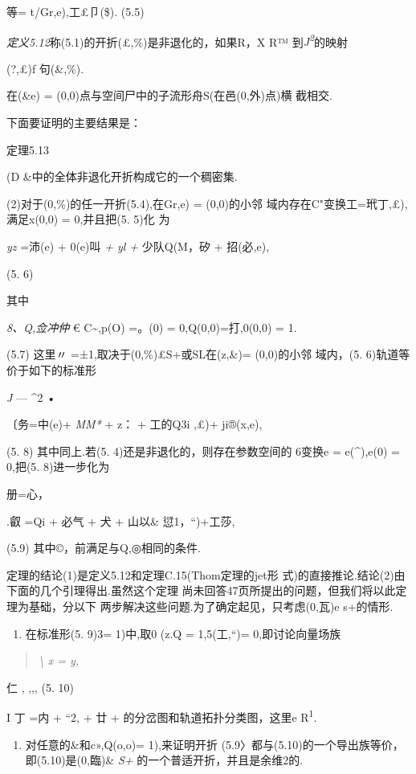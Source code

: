 \documentclass{article}
\begin{document}
等= t/Gr,e),工£卩(\$). (5.5)

\emph{定义5.12}称(5.1)的开折(£,\%)是非退化的，如果R，X R™
到\emph{J\textsuperscript{2}}的映射

(?,£)f 句(\&,\%).

在(\&e) = (0,0)点与空间尸中的子流形舟S(在邑(0,外)点)横 截相交.

下面要证明的主要结果是：

定理5.13

(D \&中的全体非退化开折构成它的一个稠密集.

(2)对于(0,\%)的任一开折(5.4),在Gr,e) = (0,0)的小邻
域内存在C"变换工=玳丁,£),满足x(0,0) = 0,并且把(5. 5)化 为

\emph{yz} =沛(e) + 0(e)叫 \emph{+ yl +} 少队Q(M，矽 + 招(必,e),

(5. 6)

其中

\emph{8、Q,佥冲仲} € C\textasciitilde{},p(O) =。(0) = 0,Q(0,0)=打,0(0,0)
= 1.

(5.7) 这里〃 =±1,取决于(0,\%)£S+或SL在(z,\&)= (0,0)的小邻 域内，(5.
6)轨道等价于如下的标准形

\emph{J} --- \^{}2 •

〔务=中(e)+ \emph{MM*} + z： + 工的Q3i ,£)+ ji®(x,e),

(5. 8) 其中同上.若(5. 4)还是非退化的，则存在参数空间的 6变换e =
e(\^{}),e(0) = 0,把(5. 8)进一步化为

册=心，

.叡 =Qi + 必气 + 犬 + 山以\& 愆1，``)+工莎,

(5.9) 其中©，前满足与Q,◎相同的条件.

定理的结论(1)是定义5.12和定理C.15(Thom定理的jet形
式)的直接推论.结论(2)由下面的几个引理得出.虽然这个定理
尚未回答47页所提出的问题，但我们将以此定理为基础，分以下
两步解决这些问题.为了确定起见，只考虑(0,瓦)e s+的情形.

\begin{enumerate}
\def\labelenumi{(\arabic{enumi})}
\item
  在标准形(5. 9)3= 1)中,取0 (z.Q = 1,5(工,``)= 0,即讨论向量场族
\end{enumerate}

\begin{quote}
\emph{\textbackslash{} x = y,}
\end{quote}

仁 , ,,, (5. 10)

I 丁 =内 + ``2, + 廿 + 的分岔图和轨道拓扑分类图，这里e
R\textsuperscript{1}.

\begin{enumerate}
\def\labelenumi{(\arabic{enumi})}
\setcounter{enumi}{1}
\item
  对任意的\&和c»,Q(o,o)= 1),来证明开折
  (5.9〉都与(5.10)的一个导出族等价，即(5.10)是(0,臨)\& \emph{S+}
  的一个普适开折，并且是余维2的.
\end{enumerate}
\end{document}
